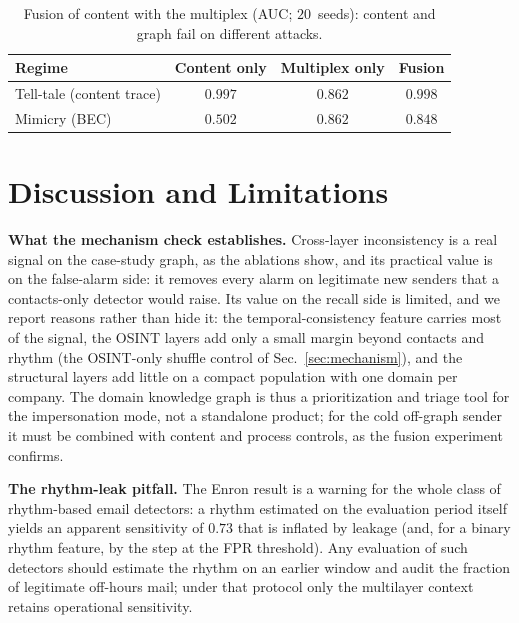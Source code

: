 \documentclass[conference]{IEEEtran}
\begin{document}
\begin{table}[t]\centering
\caption{Fusion of content with the multiplex (AUC; $20$~seeds): content and graph fail on different attacks.}
\label{tab:content}
\begin{tabular}{lccc}
\toprule
Regime & Content only & Multiplex only & Fusion \\
\midrule
Tell-tale (content trace) & $0.997$ & $0.862$ & $\mathbf{0.998}$ \\
Mimicry (BEC) & $0.502$ & $\mathbf{0.862}$ & $0.848$ \\
\bottomrule
\end{tabular}
\end{table}

\section{Discussion and Limitations}
\label{sec:discussion}
\textbf{What the mechanism check establishes.} Cross-layer inconsistency is a real signal on the
case-study graph, as the ablations show, and its practical value is on the false-alarm side: it removes every alarm on legitimate
new senders that a contacts-only detector would raise. Its value on the recall side is limited, and we report
reasons rather than hide it: the temporal-consistency feature carries most of the signal, the OSINT layers
add only a small margin beyond contacts and rhythm (the OSINT-only shuffle control of
Sec.~\ref{sec:mechanism}), and the structural layers add little on a compact population with one domain per
company. The domain knowledge graph
is thus a prioritization and triage tool for the impersonation mode, not a standalone product; for the cold
off-graph sender it must be combined with content and process controls, as the fusion experiment confirms.

\textbf{The rhythm-leak pitfall.} The Enron result is a warning for the whole class of rhythm-based email
detectors: a rhythm estimated on the evaluation period itself yields an apparent sensitivity of $0.73$ that is
inflated by leakage (and, for a binary rhythm feature, by the step at the FPR threshold). Any evaluation of such detectors should estimate the rhythm on an earlier window and
audit the fraction of legitimate off-hours mail; under that protocol only the multilayer context retains
operational sensitivity.
\end{document}
